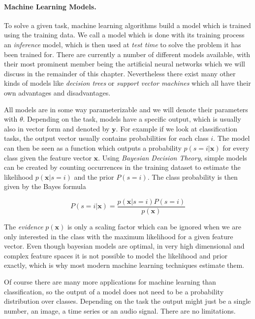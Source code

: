 \paragraph{Machine Learning Models.}
To solve a given task, machine learning algorithms build a model which is trained using the training data. We call a model which is done with its training process an \textit{inference} model, which is then used at \textit{test time} to solve the problem it has been trained for. There are currently a number of different models available, with their most prominent member being the artificial neural networks which we will discuss in the remainder of this chapter. Nevertheless there exist many other kinds of models like \textit{decision trees} or \textit{support vector machines} which all have their own advantages and disadvantages. 

All models are in some way parameterizable and we will denote their parameters with $\theta$. Depending on the task, models have a specific output, which is usually also in vector form and denoted by $\mathbf{y}$. For example if we look at classification tasks, the output vector usually contains probabilities for each class $i$. The model can then be seen as a function which outputs a probability $p(s = i| \mathbf{x})$ for every class given the feature vector $\mathbf{x}$. Using \textit{Bayesian Decision Theory}, simple models can be created by counting occurrences in the training dataset to estimate the likelihood $p(\mathbf{x}|s=i)$ and the prior $P(s=i)$. The class probability is then given by the Bayes formula 

\[P(s=i|\mathbf{x}) = \frac{p(\mathbf{x}|s=i)P(s=i)}{p(\mathbf{x})}\]

The \textit{evidence} $p(\mathbf{x})$ is only a scaling factor which can be ignored when we are only interested in the class with the maximum likelihood for a given feature vector. Even though bayesian models are optimal, in very high dimensional and complex feature spaces it is not possible to model the likelihood and prior exactly, which is why most modern machine learning techniques estimate them. 

Of course there are many more applications for machine learning than classification, so the output of a model does not need to be a probability distribution over classes. Depending on the task the output might just be a single number, an image, a time series or an audio signal. There are no limitations.

